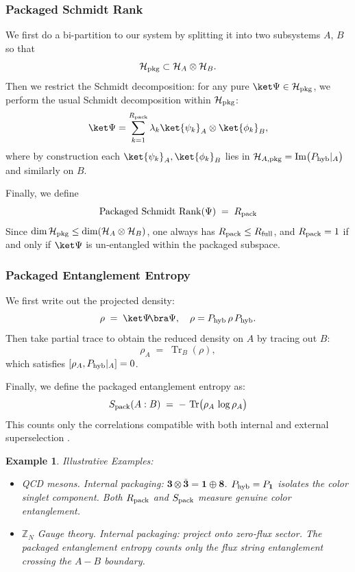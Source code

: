 \documentclass[12pt,a4paper]{article}
\newtheorem{example}{Example}
\begin{document}
\subsubsection{Packaged Schmidt Rank}

We first do a bi-partition to our system by splitting it into two subsystems $A$, $B$ so that
$$
\mathcal H_{\rm pkg}
\subset
\mathcal H_A \otimes \mathcal H_B.
$$
Then we restrict the Schmidt decomposition:
for any pure $\ket\Psi\in\mathcal H_{\rm pkg}$, we perform the usual Schmidt decomposition within $\mathcal H_{\rm pkg}$:
$$
\ket\Psi
= 
\sum_{k=1}^{R_{\rm pack}}
\lambda_k \ket{\psi_k}_A \otimes \ket{\phi_k}_B,
$$
where by construction each $\ket{\psi_k}_A,\ket{\phi_k}_B$ lies in
$\mathcal H_{A,\rm pkg} = \operatorname{Im}\bigl(P_{\rm hyb}\vert_A\bigr)$ and similarly on $B$.


Finally, we define
$$
\mathrm{Packaged\ Schmidt\ Rank}(\Psi)
\;=\;
R_{\rm pack}
$$
Since $\dim\mathcal H_{\rm pkg}\le\dim(\mathcal H_A\otimes\mathcal H_B)$, one always has $R_{\rm pack}\le R_{\rm full}$, and $R_{\rm pack}=1$ if and only if $\ket\Psi$ is un‐entangled within the packaged subspace.



\subsubsection{Packaged Entanglement Entropy}

We first write out the projected density:
$$
\rho \;=\; \ket\Psi\!\bra\Psi,
\quad
\rho = P_{\rm hyb}\,\rho\,P_{\rm hyb}.
$$
Then take partial trace to obtain the reduced density on $A$ by tracing out $B$:
$$
\rho_A
\;=\;
\operatorname{Tr}_B(\rho),
$$
which satisfies $[\rho_A,P_{\rm hyb}\vert_A]=0$.

Finally, we define the packaged entanglement entropy \cite{Shannon19483,Shannon19484,VedralPlenio1998,Casini2014,DonnellyWall2015} as:
$$
	S_{\rm pack}(A : B)
	\;=\;
	-\,\operatorname{Tr} \bigl(\rho_A\, \log\rho_A\bigr)
$$
This counts only the correlations compatible with both internal and external superselection \cite{Casini2014}.



\begin{example}
	Illustrative Examples:
	
	\begin{itemize}
		\item QCD mesons.
		Internal packaging: $\mathbf3\otimes\bar{\mathbf3}=\mathbf1\oplus\mathbf8$.
		$P_{\rm hyb}=P_{\mathbf1}$ isolates the color singlet component.
		Both $R_{\rm pack}$ and $S_{\rm pack}$ measure genuine color entanglement.
		
		\item $\mathbb Z_N$ Gauge theory.
		Internal packaging: project onto zero‐flux sector.
		The packaged entanglement entropy counts only the flux string entanglement crossing the $A - B$ boundary.
	\end{itemize}
\end{example} 
\end{document}
